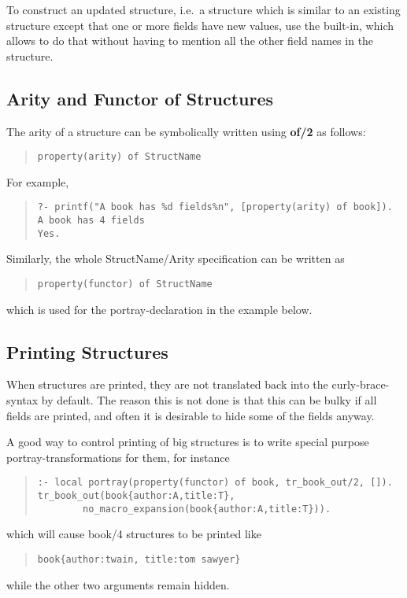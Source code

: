 To construct an updated structure, i.e.\ a structure which is similar
to an existing structure except that one or more fields have new
values, use the
built-in, which allows to do that without having to mention all the
other field names in the structure.


\subsection{Arity and Functor of Structures}

The arity of a structure can be symbolically written using {\bf of/2}
as follows:
\begin{quote}\begin{verbatim}
property(arity) of StructName
\end{verbatim}\end{quote}
For example,
\begin{quote}\begin{verbatim}
?- printf("A book has %d fields%n", [property(arity) of book]).
A book has 4 fields
Yes.
\end{verbatim}\end{quote}
Similarly, the whole StructName/Arity specification can be written as
\begin{quote}\begin{verbatim}
property(functor) of StructName
\end{verbatim}\end{quote}
which is used for the portray-declaration in the example below.


\subsection{Printing Structures}
When structures are printed, they are not translated back into the
curly-brace-syntax by default. The reason this is not done is that this can
be bulky if all fields are printed, and often
it is desirable to hide some of the fields anyway.

A good way to control printing of big structures is to write
special purpose portray-transformations for them, for instance
\begin{quote}\begin{verbatim}
:- local portray(property(functor) of book, tr_book_out/2, []).
tr_book_out(book{author:A,title:T},
        no_macro_expansion(book{author:A,title:T})).
\end{verbatim}\end{quote}
which will cause book/4 structures to be printed like
\begin{quote}\begin{verbatim}
book{author:twain, title:tom sawyer}
\end{verbatim}\end{quote}
while the other two arguments remain hidden.

